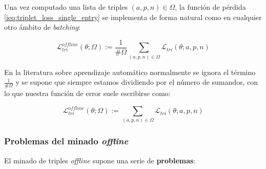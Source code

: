 Una vez computado una lista de triples $(a, p, n) \in \Omega$, la función de pérdida \eqref{ieq:triplet_loss_single_entry} se implementa de forma natural como en cualquier otro ámbito de \textit{batching}:

\begin{equation}
    \mathcal{L}_{tri}^{offline}(\theta; \Omega) := \frac{1}{\#\Omega} \sum_{(a, p, n) \in \Omega} \mathcal{L}_{tri}(\theta; a, p, n)
\end{equation}

En la literatura sobre aprendizaje automático normalmente se ignora el término $\frac{1}{\#\Omega}$ y se supone que siempre estamos dividiendo por el número de sumandos, con lo que nuestra función de error suele escribirse como:

\begin{equation}
    \mathcal{L}_{tri}^{offline}(\theta; \Omega) := \sum_{(a, p, n) \in \Omega} \mathcal{L}_{tri}(\theta; a, p, n)
\end{equation}

\subsubsection{Problemas del minado \textit{offline}}

El minado de triples \textit{offline} supone una serie de \textbf{problemas}:

